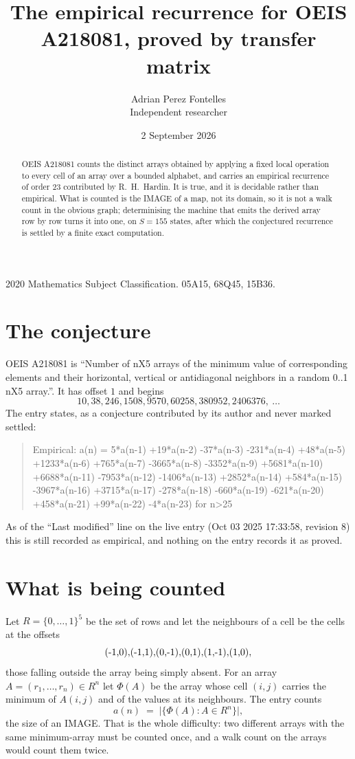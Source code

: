 \documentclass[11pt,a4paper]{article}
\title{The empirical recurrence for OEIS A218081, proved by transfer matrix}
\author{Adrian Perez Fontelles\\ \small Independent researcher}
\date{2 September 2026}
\theoremstyle{plain}
\theoremstyle{definition}
\begin{document}
\maketitle

\begin{abstract}
OEIS A218081 counts the distinct arrays obtained by applying a fixed local operation to every cell
of an array over a bounded alphabet, and carries an empirical recurrence of order $23$
contributed by R.~H.~Hardin. It is true, and it is decidable rather than empirical. What is
counted is the IMAGE of a map, not its domain, so it is not a walk count in the obvious graph;
determinising the machine that emits the derived array row by row turns it into one, on
$S=155$ states, after which the conjectured recurrence is settled by a finite exact
computation.
\end{abstract}

\noindent\small 2020 Mathematics Subject Classification. 05A15, 68Q45, 15B36.\normalsize

\section{The conjecture}

OEIS A218081 is ``Number of nX5 arrays of the minimum value of corresponding elements and their horizontal, vertical or antidiagonal neighbors in a random 0..1 nX5 array.''. It has offset $1$ and begins
\[
10, 38, 246, 1508, 9570, 60258, 380952, 2406376,\ \dots
\]
The entry states, as a conjecture contributed by its author and never marked settled:
\begin{quote}
Empirical: a(n) = 5*a(n-1) +19*a(n-2) -37*a(n-3) -231*a(n-4) +48*a(n-5) +1233*a(n-6) +765*a(n-7) -3665*a(n-8) -3352*a(n-9) +5681*a(n-10) +6688*a(n-11) -7953*a(n-12) -1406*a(n-13) +2852*a(n-14) +584*a(n-15) -3967*a(n-16) +3715*a(n-17) -278*a(n-18) -660*a(n-19) -621*a(n-20) +458*a(n-21) +99*a(n-22) -4*a(n-23) for n>25
\end{quote}
As of the ``Last modified'' line on the live entry (Oct 03 2025 17:33:58, revision 8) this is still
recorded as empirical, and nothing on the entry records it as proved.

\section{What is being counted}

Let $R=\{0,\dots,1\}^{5}$ be the set of rows and let the neighbours of
a cell be the cells at the offsets
\[
$(-1,0)$, $(-1,1)$, $(0,-1)$, $(0,1)$, $(1,-1)$, $(1,0)$,
\]
those falling outside the array being simply absent. For an array
$A=(r_1,\dots,r_n)\in R^n$ let $\Phi(A)$ be the array whose cell $(i,j)$ carries the
minimum of $A(i,j)$ and of the values at its neighbours. The entry counts
\[
a(n)\;=\;\bigl|\{\Phi(A):A\in R^n\}\bigr| ,
\]
the size of an IMAGE. That is the whole difficulty: two different arrays with the same
minimum-array must be counted once, and a walk count on the arrays would count them twice.
\end{document}
